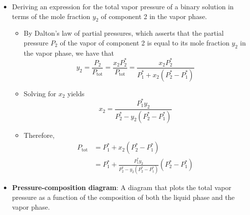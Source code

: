 \documentclass[../notes.tex]{subfiles}
\begin{document}
\begin{itemize}
\begin{itemize}
    \end{itemize}
    \item Deriving an expression for the total vapor pressure of a binary solution in terms of the mole fraction $y_2$ of component 2 in the vapor phase.
    \begin{itemize}
        \item By Dalton's law of partial pressures, which asserts that the partial pressure $P_2$ of the vapor of component 2 is equal to its mole fraction $y_2$ in the vapor phase, we have that
        \begin{equation*}
            y_2 = \frac{P_2}{P_\text{tot}}
            = \frac{x_2P_2^*}{P_\text{tot}}
            = \frac{x_2P_2^*}{P_1^*+x_2(P_2^*-P_1^*)}
        \end{equation*}
        \item Solving for $x_2$ yields
        \begin{equation*}
            x_2 = \frac{P_1^*y_2}{P_2^*-y_2(P_2^*-P_1^*)}
        \end{equation*}
        \item Therefore,
        \begin{align*}
            P_\text{tot} &= P_1^*+x_2(P_2^*-P_1^*)\\
            &= P_1^*+\frac{P_1^*y_2}{P_2^*-y_2(P_2^*-P_1^*)}(P_2^*-P_1^*)
        \end{align*}
    \end{itemize}
    \item \textbf{Pressure-composition diagram}: A diagram that plots the total vapor pressure as a function of the composition of both the liquid phase and the vapor phase.
    \begin{figure}[H]
        \centering
\end{figure}
\end{itemize}
\end{document}
